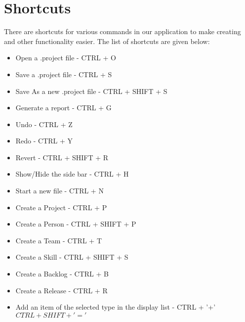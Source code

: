 \section{Shortcuts}

There are shortcuts for various commands in our application to make creating and other functionality easier. The list of shortcuts are given below:

\begin{itemize}
\item Open a .project file - CTRL + O
\item Save a .project file - CTRL + S
\item Save As a new .project file - CTRL + SHIFT + S
\item Generate a report - CTRL + G
\item Undo - CTRL + Z
\item Redo - CTRL + Y
\item Revert - CTRL + SHIFT + R
\item Show/Hide the side bar - CTRL + H
\item Start a new file - CTRL + N
\item Create a Project - CTRL + P
\item Create a Person - CTRL + SHIFT + P
\item Create a Team - CTRL + T
\item Create a Skill - CTRL + SHIFT + S
\item Create a Backlog - CTRL + B
\item Create a Release - CTRL + R
\item Add an item of the selected type in the display list - CTRL + '+' \(CTRL + SHIFT + '='\)
\end{itemize}